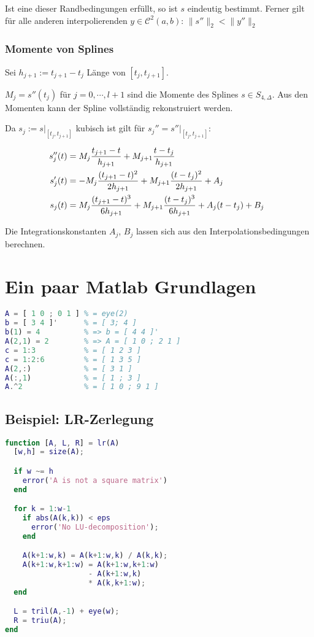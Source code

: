 Ist eine dieser Randbedingungen erfüllt, so ist $s$ eindeutig bestimmt. Ferner gilt für alle anderen interpolierenden $y \in \mathcal{C}^2(a,b)$: $\|s''\|_2 < \|y''\|_2$

\subsubsection*{Momente von Splines}

Sei $h_{j+1} := t_{j+1} - t_j$ Länge von $[t_j,t_{j+1}]$.

$M_j = s''(t_j)$ für $j = 0, \cdots, l+1$ sind die Momente des Splines $s \in S_{4,\Delta}$. Aus den Momenten kann der Spline vollständig rekonstruiert werden.

Da $s_j := s|_{[t_j,t_{j+1}]}$ kubisch ist gilt für $s_j'' = s''|_{[t_j,t_{j+1}]}$:


\begin{align*}
\hspace{-2mm} s_j''(t) &= M_j \frac{t_{j+1}-t}{h_{j+1}} + M_{j+1} \frac{t-t_j}{h_{j+1}} \\
\hspace{-2mm} s_j'(t)  &= -M_j \frac{(t_{j+1} - t)^2}{2h_{j+1}} + M_{j+1} \frac{(t-t_j)^2}{2h_{j+1}} + A_j \\
\hspace{-2mm} s_j(t)   &= M_j \frac{(t_{j+1} - t)^3}{6h_{j+1}} + M_{j+1} \frac{(t-t_j)^3}{6h_{j+1}} + A_j(t-t_j) + B_j
\end{align*}

Die Integrationskonstanten $A_j$, $B_j$ lassen sich aus den Interpolationsbedingungen berechnen.

\section*{Ein paar Matlab Grundlagen}

\begin{lstlisting}[frame=single,language=Matlab]
A = [ 1 0 ; 0 1 ] % = eye(2)
b = [ 3 4 ]'      % = [ 3; 4 ]
b(1) = 4          % => b = [ 4 4 ]'
A(2,1) = 2        % => A = [ 1 0 ; 2 1 ]
c = 1:3           % = [ 1 2 3 ]
c = 1:2:6         % = [ 1 3 5 ]
A(2,:)            % = [ 3 1 ]
A(:,1)            % = [ 1 ; 3 ]
A.^2              % = [ 1 0 ; 9 1 ]
\end{lstlisting}

\subsection*{Beispiel: LR-Zerlegung}

\begin{lstlisting}[frame=single,language=Matlab]
function [A, L, R] = lr(A)
  [w,h] = size(A);

  if w ~= h
    error('A is not a square matrix')
  end

  for k = 1:w-1
    if abs(A(k,k)) < eps
      error('No LU-decomposition');
    end

    A(k+1:w,k) = A(k+1:w,k) / A(k,k);
    A(k+1:w,k+1:w) = A(k+1:w,k+1:w)
                   - A(k+1:w,k)
                   * A(k,k+1:w);
  end

  L = tril(A,-1) + eye(w);
  R = triu(A);
end
\end{lstlisting}
